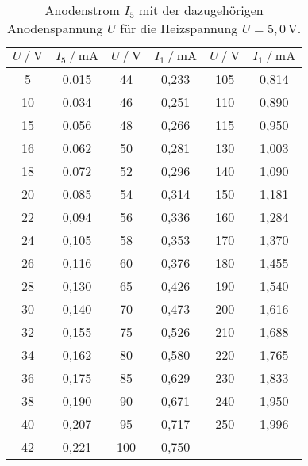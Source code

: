 \begin{table}[H]
    \centering
    \caption{Anodenstrom $I_5$ mit der dazugehörigen Anodenspannung $U$ für die Heizspannung $U = 5,0 \, \unit{\volt} $.}
    \label{tab:kennlini1_5}
    \begin{tabular}{S S S S S[table-format=3.1] S}
      \toprule
      {$U \mathbin{/} \unit{\volt}$} & {$I_5 \mathbin{/} \unit{\milli\ampere}$} & {$U \mathbin{/} \unit{\volt}$} & {$I_1 \mathbin{/} \unit{\milli\ampere}$} & {$U \mathbin{/} \unit{\volt}$} & {$I_1 \mathbin{/} \unit{\milli\ampere}$}  \\
      \midrule
            {5}&       {0,015}&   {44}&      {0,233}& {105}&     {0,814}\\
            {10}&      {0,034}&   {46}&      {0,251}& {110}&     {0,890}\\
            {15}&      {0,056}&   {48}&      {0,266}& {115}&     {0,950}\\
            {16}&      {0,062}&   {50}&      {0,281}& {130}&     {1,003}\\
            {18}&      {0,072}&   {52}&      {0,296}& {140}&     {1,090}\\
            {20}&      {0,085}&   {54}&      {0,314}& {150}&     {1,181}\\
            {22}&      {0,094}&   {56}&      {0,336}& {160}&     {1,284}\\
            {24}&      {0,105}&   {58}&      {0,353}& {170}&     {1,370}\\
            {26}&      {0,116}&   {60}&      {0,376}& {180}&     {1,455}\\
            {28}&      {0,130}&   {65}&      {0,426}& {190}&     {1,540}\\
            {30}&      {0,140}&   {70}&      {0,473}& {200}&     {1,616}\\
            {32}&      {0,155}&   {75}&      {0,526}& {210}&     {1,688}\\
            {34}&      {0,162}&   {80}&      {0,580}& {220}&     {1,765}\\
            {36}&      {0,175}&   {85}&      {0,629}& {230}&     {1,833}\\
            {38}&      {0,190}&   {90}&      {0,671}& {240}&     {1,950}\\
            {40}&      {0,207}&   {95}&      {0,717}& {250}&     {1,996}\\
            {42}&      {0,221}&   {100}&     {0,750}&  {-} & {-}\\
      \bottomrule
    \end{tabular}
\end{table}


